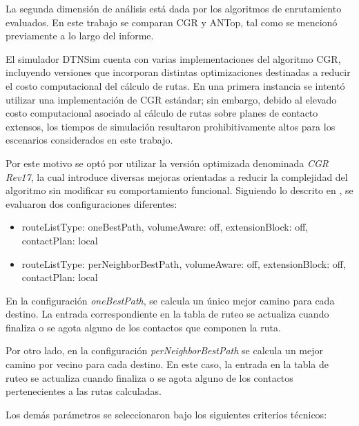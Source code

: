 La segunda dimensión de análisis está dada por los algoritmos de enrutamiento evaluados. En este trabajo se comparan CGR y ANTop, tal como se mencionó previamente a lo largo del informe.

El simulador DTNSim cuenta con varias implementaciones del algoritmo CGR, incluyendo versiones que incorporan distintas optimizaciones destinadas a reducir el costo computacional del cálculo de rutas. En una primera instancia se intentó utilizar una implementación de CGR estándar; sin embargo, debido al elevado costo computacional asociado al cálculo de rutas sobre planes de contacto extensos, los tiempos de simulación resultaron prohibitivamente altos para los escenarios considerados en este trabajo.

Por este motivo se optó por utilizar la versión optimizada denominada \textit{CGR Rev17}, la cual introduce diversas mejoras orientadas a reducir la complejidad del algoritmo sin modificar su comportamiento funcional. Siguiendo lo descrito en \cite{FRAIRE201831}, se evaluaron dos configuraciones diferentes:

\begin{itemize}
    \item routeListType: oneBestPath, volumeAware: off, extensionBlock: off, contactPlan: local
    \item routeListType: perNeighborBestPath, volumeAware: off, extensionBlock: off, contactPlan: local
\end{itemize}

En la configuración \textit{oneBestPath}, se calcula un único mejor camino para cada destino. La entrada correspondiente en la tabla de ruteo se actualiza cuando finaliza o se agota alguno de los contactos que componen la ruta.

Por otro lado, en la configuración \textit{perNeighborBestPath} se calcula un mejor camino por vecino para cada destino. En este caso, la entrada en la tabla de ruteo se actualiza cuando finaliza o se agota alguno de los contactos pertenecientes a las rutas calculadas.

Los demás parámetros se seleccionaron bajo los siguientes criterios técnicos:

